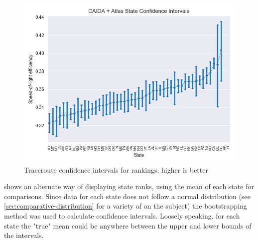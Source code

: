 \begin{figure}[h]
    \centering
    \includegraphics{images/comparative/confidence_intervals/caida_confidence_interval.png}
    \caption{Traceroute confidence intervals for rankings; higher is better}
    \label{fig:caida_confidence_intervals}
\end{figure}

 shows an alternate way of displaying state ranks, using the mean of each state for comparisons. Since data for each state does not follow a normal distribution (see \cref{sec:comparative-distribution} for a variety of \kdes on the subject) the bootstrapping method was used to calculate confidence intervals. Loosely speaking, for each state the "true" mean could be anywhere between the upper and lower bounds of the intervals.
